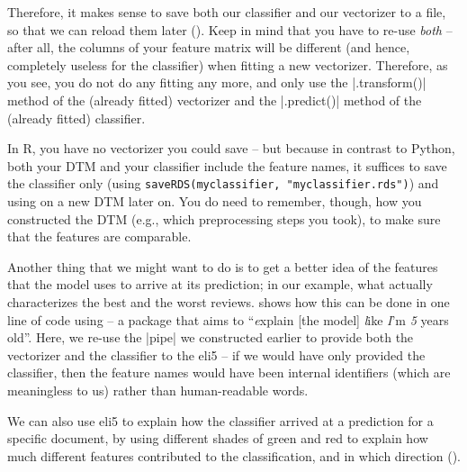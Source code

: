 Therefore, it makes sense to save both our classifier and our
vectorizer to a file, so that we can reload them later
(). Keep in mind that you have to re-use \emph{both}
-- after all, the columns of your feature matrix will be different (and hence, completely useless for the classifier) when
fitting a new vectorizer. Therefore, as you see, you do not do any fitting any more, and only use the |.transform()| method of the (already fitted) vectorizer and the |.predict()| method of the (already fitted) classifier.

In R, you have no vectorizer you could save -- but because in contrast to Python, both your DTM and your classifier include the feature names, it suffices to save the classifier only (using \verb+saveRDS(myclassifier, "myclassifier.rds")+) and using on a new DTM later on. You do need to remember, though, how you constructed the DTM (e.g., which preprocessing steps you took), to make sure that the features are comparable.




Another thing that we might want to do is to get a better idea of the
features that the model uses to arrive at its prediction; in our
example, what actually characterizes the best and the worst
reviews.  shows how this can be done in one line of code
using  -- a package that aims to ``\emph{e}xplain [the model]
\emph{l}ike \emph{I}'m \emph{5} years old''. Here, we re-use the
|pipe| we constructed earlier to provide both the vectorizer and the
classifier to the eli5 -- if we would have only provided the
classifier, then the feature names would have been internal
identifiers (which are meaningless to us) rather than human-readable
words.


We can also use eli5 to explain how the classifier arrived at a
prediction for a specific document, by using different shades of green
and red to explain how much different features contributed to the
classification, and in which direction ().





